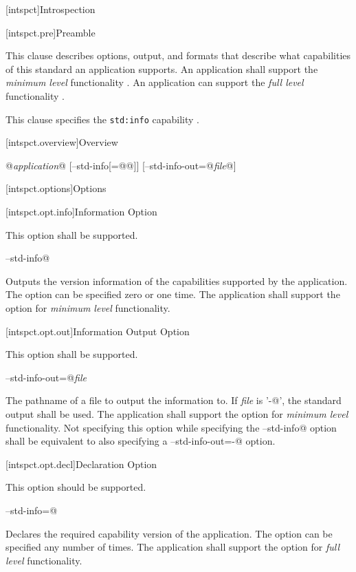 
[intspct]{Introspection}

[intspct.pre]{Preamble}

\pnum
This clause describes options, output, and formats that describe what
capabilities of this standard an application supports. An application shall
support the \emph{minimum level} functionality . An
application can support the \emph{full level} functionality .

\pnum
This clause specifies the \verb|std:info| capability .

[intspct.overview]{Overview}

\pnum
\begin{outputblock}
@\emph{application}@ [--std-info[=@@]] [--std-info-out=@\emph{file}@]
\end{outputblock}

[intspct.options]{Options}

[intspct.opt.info]{Information Option}

\pnum
This option shall be supported.

\pnum
\verb@--std-info@
\begin{indented}
	Outputs the version information of the capabilities supported by the
	application.
	The option can be specified zero or one time.
	The application shall support the option for \emph{minimum level}
	 functionality.
\end{indented}

[intspct.opt.out]{Information Output Option}

\pnum
This option shall be supported.

\pnum
\verb@--std-info-out=@\emph{file}
\begin{indented}
	The pathname of a file to output the information to. If \emph{file} is
	'\verb@-@', the standard output shall be used.
	The application shall support the option for \emph{minimum level}
	 functionality.
	Not specifying this option while specifying the \verb@--std-info@ option
	 shall be equivalent to also specifying a
	\verb@--std-info-out=-@ option.
\end{indented}

[intspct.opt.decl]{Declaration Option}

\pnum
This option should be supported.

\pnum
\verb@--std-info=@
\begin{indented}
	Declares the required capability version of the application.
	The option can be specified any number of times.
	The application shall support the option for \emph{full level}
	 functionality.
\end{indented}

